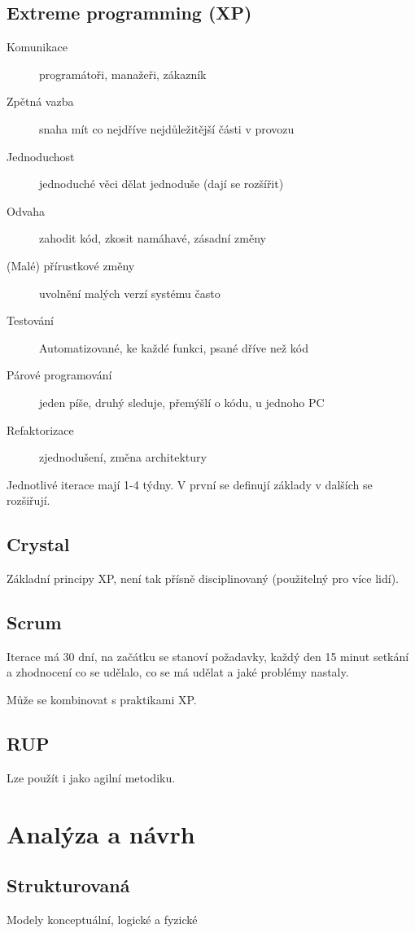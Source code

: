 \documentclass[a4paper, 11pt]{report}
\begin{document}
\subsection{Extreme programming (XP)}
\begin{description}
	\item[Komunikace] programátoři, manažeři, zákazník
	\item[Zpětná vazba] snaha mít co nejdříve nejdůležitější části v provozu
	\item[Jednoduchost] jednoduché věci dělat jednoduše (dají se rozšířit)
	\item[Odvaha] zahodit kód, zkosit namáhavé, zásadní změny
	\item[(Malé) přírustkové změny] uvolnění malých verzí systému často
	\item[Testování] Automatizované, ke každé funkci, psané dříve než kód
	\item[Párové programování] jeden píše, druhý sleduje, přemýšlí o kódu, u jednoho PC
	\item[Refaktorizace] zjednodušení, změna architektury
\end{description}

Jednotlivé iterace mají 1-4 týdny. V první se definují základy v dalších se rozšiřují.

\subsection{Crystal}
Základní principy XP, není tak přísně disciplinovaný (použitelný pro více lidí).

\subsection{Scrum}
Iterace má 30 dní, na začátku se stanoví požadavky, každý den 15 minut setkání a zhodnocení co se udělalo, co se má udělat a jaké problémy nastaly.

Může se kombinovat s praktikami XP.

\subsection{RUP}
Lze použít i jako agilní metodiku.

\section{Analýza a návrh}

\subsection{Strukturovaná}
Modely konceptuální, logické a fyzické
\end{document}

